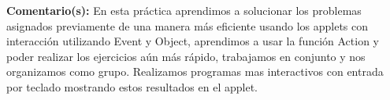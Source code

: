 \noindent\textbf{Comentario(s):} 
En esta práctica aprendimos a solucionar los problemas asignados previamente de una manera más eficiente usando los applets con interacción utilizando Event y Object, aprendimos a usar la función Action y poder realizar los ejercicios aún más rápido, trabajamos en conjunto y nos organizamos como grupo. Realizamos programas mas interactivos con entrada por teclado mostrando estos resultados en el applet. 